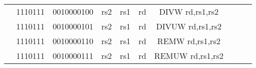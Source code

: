 \begin{table}[p]
\begin{small}
\begin{center}
\begin{tabular}{rcccccccccccl}
&
\multicolumn{1}{|c|}{1110111} &
\multicolumn{4}{c|}{0010000100} &
\multicolumn{1}{c|}{rs2} &
\multicolumn{1}{c|}{rs1} &
\multicolumn{1}{c|}{rd} & DIVW rd,rs1,rs2 \\
\cline{2-9}
  

&
\multicolumn{1}{|c|}{1110111} &
\multicolumn{4}{c|}{0010000101} &
\multicolumn{1}{c|}{rs2} &
\multicolumn{1}{c|}{rs1} &
\multicolumn{1}{c|}{rd} & DIVUW rd,rs1,rs2 \\
\cline{2-9}
  

&
\multicolumn{1}{|c|}{1110111} &
\multicolumn{4}{c|}{0010000110} &
\multicolumn{1}{c|}{rs2} &
\multicolumn{1}{c|}{rs1} &
\multicolumn{1}{c|}{rd} & REMW rd,rs1,rs2 \\
\cline{2-9}
  

&
\multicolumn{1}{|c|}{1110111} &
\multicolumn{4}{c|}{0010000111} &
\multicolumn{1}{c|}{rs2} &
\multicolumn{1}{c|}{rs1} &
\multicolumn{1}{c|}{rd} & REMUW rd,rs1,rs2 \\
\cline{2-9}
  

\end{tabular}
\end{center}
\end{small}

\label{instr-table}
\end{table}
  

\newpage


